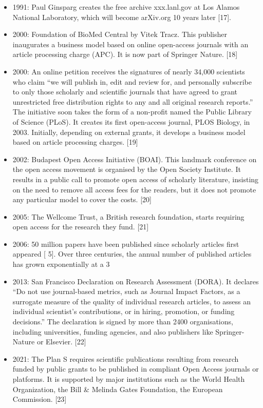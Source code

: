 \documentclass[10pt,compress,serif]{beamer}
\begin{document}
\begin{frame}[t]
\begin{itemize}
 \item 1991: Paul Ginsparg creates the free archive xxx.lanl.gov at Los Alamos National Laboratory, which will become arXiv.org 10 years later [17].
   \item 2000: Foundation of BioMed Central by Vitek Tracz. This publisher inaugurates a business model based on online open-access journals with an article processing charge (APC). It is now part of Springer Nature. [18]
 \item 2000: An online petition receives the signatures of nearly 34,000 scientists who claim “we will publish in, edit and review for, and personally subscribe to only those scholarly and scientific journals that have agreed to grant unrestricted free distribution rights to any and all original research reports.” The initiative soon takes the form of a non-profit named the Public Library of Science (PLoS). It creates its first open-access journal, PLOS Biology, in 2003. Initially, depending on external grants, it develops a business model based on article processing charges. [19]

 \item 2002: Budapest Open Access Initiative (BOAI). This landmark conference on the open access movement is organised by the Open Society Institute. It results in a public call to promote open access of scholarly literature, insisting on the need to remove all access fees for the readers, but it does not promote any particular model to cover the costs. [20]
 \item 2005: The Wellcome Trust, a British research foundation, starts requiring open access for the research they fund. [21]
 \item 2006: 50 million papers have been published since scholarly articles first appeared [ 5]. Over three centuries, the annual number of published articles has grown exponentially at a 3%
 \item 2013: San Francisco Declaration on Research Assessment (DORA). It declares “Do not use journal-based metrics, such as Journal Impact Factors, as a surrogate measure of the quality of individual research articles, to assess an individual scientist’s contributions, or in hiring, promotion, or funding decisions.” The declaration is signed by more than 2400 organisations, including universities, funding agencies, and also publishers like Springer-Nature or Elsevier. [22]
 \item 2021: The Plan S requires scientific publications resulting from research funded by public grants to be published in compliant Open Access journals or platforms. It is supported by major institutions such as the World Health Organization, the Bill \& Melinda Gates Foundation, the European Commission. [23]

 \end{itemize}
\end{frame}
 
\end{document}
